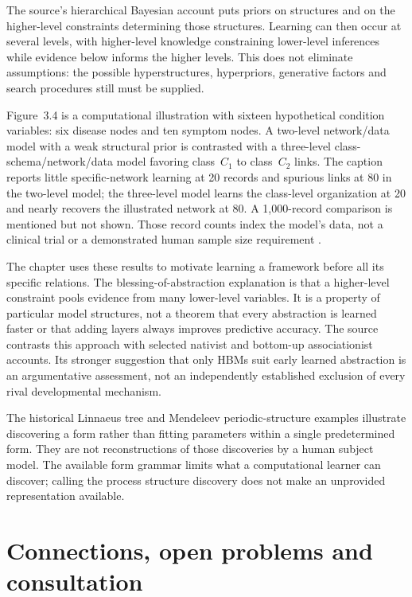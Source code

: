 The source's hierarchical Bayesian account puts priors on structures and
on the higher-level constraints determining those structures. Learning
can then occur at several levels, with higher-level knowledge constraining
lower-level inferences while evidence below informs the higher levels.
This does not eliminate assumptions: the possible hyperstructures,
hyperpriors, generative factors and search procedures still must be supplied.

Figure~3.4 is a computational illustration with sixteen hypothetical
condition variables: six disease nodes and ten symptom nodes. A two-level
network/data model with a weak structural prior is contrasted with a
three-level class-schema/network/data model favoring class~\(C_1\)
to class~\(C_2\) links. The caption reports little specific-network
learning at 20 records and spurious links at 80 in the two-level model;
the three-level model learns the class-level organization at 20 and
nearly recovers the illustrated network at 80. A 1,000-record comparison
is mentioned but not shown. Those record counts index the model's data,
not a clinical trial or a demonstrated human sample size requirement
\cite[pp.~30--32, figs.~3.3--4]{GriffithsTenenbaumKemp2012BayesianInference}.

The chapter uses these results to motivate learning a framework before
all its specific relations. The blessing-of-abstraction explanation is
that a higher-level constraint pools evidence from many lower-level
variables. It is a property of particular model structures, not a theorem
that every abstraction is learned faster or that adding layers always
improves predictive accuracy. The source contrasts this approach with
selected nativist and bottom-up associationist accounts. Its stronger
suggestion that only HBMs suit early learned abstraction is an argumentative
assessment, not an independently established exclusion of every rival
developmental mechanism.

The historical Linnaeus tree and Mendeleev periodic-structure examples
illustrate discovering a form rather than fitting parameters within a
single predetermined form. They are not reconstructions of those
discoveries by a human subject model. The available form grammar limits
what a computational learner can discover; calling the process structure
discovery does not make an unprovided representation available.

\section{Connections, open problems and consultation}
\label{sec:p19-bci-use}

